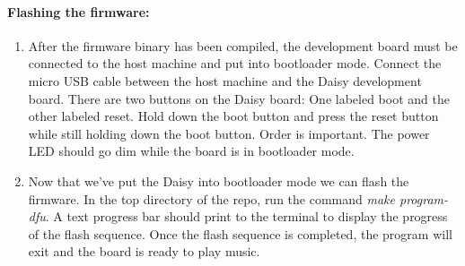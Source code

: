 \documentclass[acmlarge,screen]{acmart}
\begin{document}
\paragraph{Flashing the firmware:}
\begin{enumerate}
	\item After the firmware binary has been compiled, the development board must be connected to the host machine and put into bootloader mode. Connect the micro USB cable between the host machine and the Daisy development board. There are two buttons on the Daisy board: One labeled boot and the other labeled reset. Hold down the boot button and press the reset button while still holding down the boot button. Order is important. The power LED should go dim while the board is in bootloader mode.
	\item Now that we've put the Daisy into bootloader mode we can flash the firmware. In the top directory of the repo, run the command \textit{make program-dfu}. A text progress bar should print to the terminal to display the progress of the flash sequence. Once the flash sequence is completed, the program will exit and the board is ready to play music.
\end{enumerate}
\end{document}
